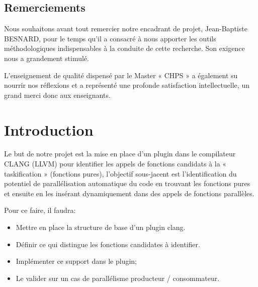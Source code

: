 \documentclass[12pt,titlepage]{article}
\begin{document}
\begin{center}
	\begin{minipage}{13cm}


\section*{ \huge \bfseries \center Remerciements}
Nous souhaitons avant tout remercier notre encadrant de projet, Jean-Baptiste BESNARD, pour le temps qu’il a consacré à nous apporter les outils méthodologiques indispensables à la conduite de cette recherche. Son exigence nous a grandement stimulé.

L’enseignement de qualité dispensé par le Master « CHPS » a également su nourrir nos réflexions et a représenté une profonde satisfaction intellectuelle, un grand merci donc aux enseignants.

	\end{minipage}
\end{center}





\pagebreak

\renewcommand*\contentsname{Sommaire}
\tableofcontents

\pagebreak

\section{Introduction}

Le but de notre projet est la mise en place d’un plugin dans le compilateur CLANG (LLVM) pour identifier les appels de fonctions candidats à la « taskification » (fonctions pures), l'objectif sous-jacent est l'identification du potentiel de parallélisation automatique du code en trouvant les fonctions pures et ensuite en les insérant dynamiquement dans des appels de fonctions parallèles.

Pour ce faire, il faudra: 


\begin{itemize}
	\item Mettre en place la structure de base d’un plugin clang.
	\item Définir ce qui distingue les fonctions candidates à identifier.
	\item Implémenter ce support dans le plugin;
	\item Le valider sur un cas de parallélisme producteur / consommateur.
\end{itemize}
\end{document}
